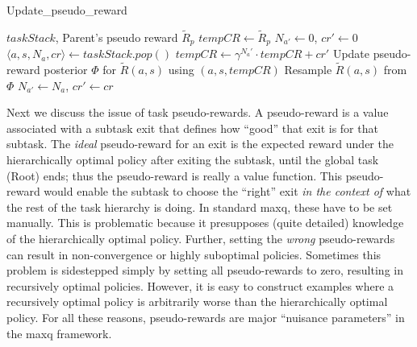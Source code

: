 {\footnotesize \begin{algorithm}[t]
\caption{{\sc Update\_pseudo\_reward}}\label{alg:pr}
\begin{algorithmic}[1]
\REQUIRE $taskStack$, Parent's pseudo reward $\tilde{R}_p$
\STATE $ tempCR \leftarrow \tilde{R}_p$
\STATE $N_{a'} \leftarrow 0$, $cr' \leftarrow 0$
\STATE $\langle a, s, N_a, cr \rangle \leftarrow taskStack.pop()$
\STATE $ tempCR \leftarrow \gamma^{N_a'}\cdot tempCR+cr'$
\STATE Update pseudo-reward posterior $\Phi$ for $\tilde{R}(a, s)$ using $(a, s, tempCR)$
\STATE Resample $\tilde{R}(a, s)$ from $\Phi$
\STATE $N_{a'} \leftarrow N_a$, $cr' \leftarrow cr$
\ENDWHILE
\end{algorithmic}
\end{algorithm}
}



Next we discuss the issue of task pseudo-rewards. A pseudo-reward is a
value associated with a subtask exit that defines how ``good'' that
exit is for that subtask. The {\em ideal} pseudo-reward for an exit is
the expected reward under the hierarchically optimal policy after
exiting the subtask, until the global task (Root) ends; thus the
pseudo-reward is really a value function.  This pseudo-reward would
enable the subtask to choose the ``right'' exit {\em in the context
  of} what the rest of the task hierarchy is doing. In standard {\sc
  maxq}, these have to be set manually. This is problematic because it
presupposes (quite detailed) knowledge of the hierarchically optimal
policy. Further, setting the {\em wrong} pseudo-rewards can result in
non-convergence or highly suboptimal policies. Sometimes this problem
is sidestepped simply by setting all pseudo-rewards to zero, resulting
in recursively optimal policies. However, it is easy to construct
examples where a recursively optimal policy is arbitrarily worse than
the hierarchically optimal policy. For all these reasons,
pseudo-rewards are major ``nuisance parameters'' in the {\sc maxq}
framework.

